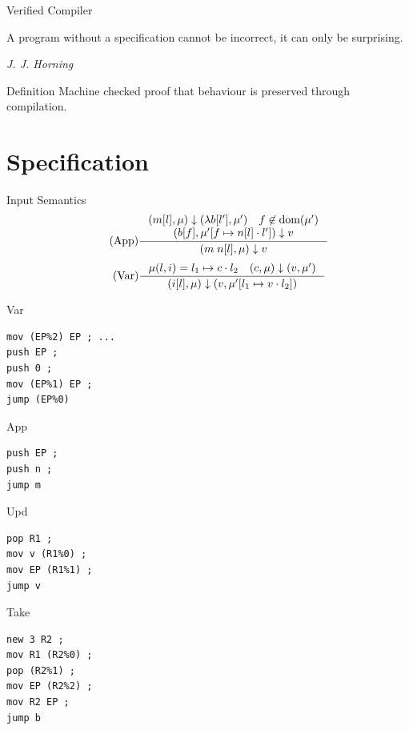 \documentclass[14pt,mathserif]{beamer}
\newcommand{\sectionslide}[3]{
  \begin{frame}
  \vspace{1cm}
  \vfill
  {\usebeamerfont{title} \color{red} #1}
  \vfill
  \epigraph{\footnotesize{#2}}{\footnotesize{\emph{#3}}}
  \end{frame}}
\begin{document}
\sectionslide{Verified Compiler}
{A program without a specification cannot be incorrect, it can only be
surprising.}
{J. J. Horning}

\begin{frame}{Definition}
Machine checked proof that behaviour is preserved through compilation.
\end{frame}

\section{Specification}
\begin{frame}{Input Semantics}
\begin{align*}
\tag{App} \inference
{(m[l], \mu) \downarrow (\lambda b[l'], \mu') \quad f \not \in \textnormal{dom}(\mu') \\ 
(b[f], \mu'[f \mapsto n[l] \cdot l']) \downarrow v}
{(m \; n[l], \mu) \downarrow v}  
\end{align*}
\begin{align*}
\tag{Var} \inference
{\mu(l, i) = l_1 \mapsto c \cdot l_2 \quad (c, \mu) \downarrow (v, \mu')}
{(i[l],\mu) \downarrow (v, \mu'[l_1 \mapsto v \cdot l_2])}
\end{align*}
\end{frame}


\begin{frame}[fragile]{Var}
\begin{lstlisting}
mov (EP%2) EP ; ... 
push EP ;
push 0 ;
mov (EP%1) EP ;
jump (EP%0)
\end{lstlisting}
\end{frame}

\begin{frame}[fragile]{App}
\begin{lstlisting}
push EP ;
push n ;
jump m 
\end{lstlisting}
\end{frame}

\begin{frame}[fragile]{Upd}
\begin{lstlisting}
pop R1 ;
mov v (R1%0) ;
mov EP (R1%1) ;
jump v 
\end{lstlisting}
\end{frame}

\begin{frame}[fragile]{Take}
\begin{lstlisting}
new 3 R2 ;
mov R1 (R2%0) ;
pop (R2%1) ;
mov EP (R2%2) ;
mov R2 EP ;
jump b
\end{lstlisting}
\end{frame}
\end{document}

